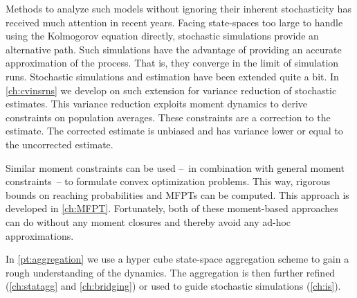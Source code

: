Methods to analyze such models without ignoring their inherent stochasticity has received much attention in recent years.
Facing state-spaces too large to handle using the Kolmogorov equation directly, stochastic simulations \parencite{gillespie1977exact} provide an alternative path.
Such simulations have the advantage of providing an accurate approximation of the process.
That is, they converge in the limit of simulation runs.
Stochastic simulations and estimation have been extended quite a bit.
In \autoref{ch:cvinsrns} we develop on such extension for variance reduction of stochastic estimates.
This variance reduction exploits moment dynamics to derive constraints on population averages.
These constraints are a correction to the estimate.
The corrected estimate is unbiased and has variance lower or equal to the uncorrected estimate.

Similar moment constraints can be used  --~in combination with general moment constraints~-- to formulate convex optimization problems.
This way, rigorous bounds on reaching probabilities and \aclp{MFPT} can be computed.
This approach is developed in \autoref{ch:MFPT}.
Fortunately, both of these moment-based approaches can do without any moment closures
and thereby avoid any ad-hoc approximations.

In \autoref{pt:aggregation} we use a hyper cube state-space aggregation scheme to gain a rough understanding of the dynamics.
The aggregation is then further refined (\autoref{ch:statagg} and \autoref{ch:bridging}) or used to guide stochastic simulations (\autoref{ch:is}).


